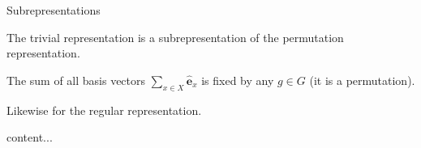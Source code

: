 \documentclass[handout,  12pt]{beamer}
\newcommand{\1}{\mathbf{1}}
\newcommand{\0}{\mathbf{0}}
\newcommand{\bas}{\mathbf{\hat{e}}}
\begin{document}
	
	\begin{frame}{Subrepresentations}
		\begin{example}
			The trivial representation is a subrepresentation of the permutation representation.
			
			The sum of all basis vectors $\sum_{x \in X} \bas_x$ is fixed by any $g \in G$ (it is a permutation).
		\end{example}
		
		\begin{example}
			Likewise for the regular representation.
		\end{example}
	\end{frame}
	
	\begin{frame}
		content...
	\end{frame}
	
\end{document}
